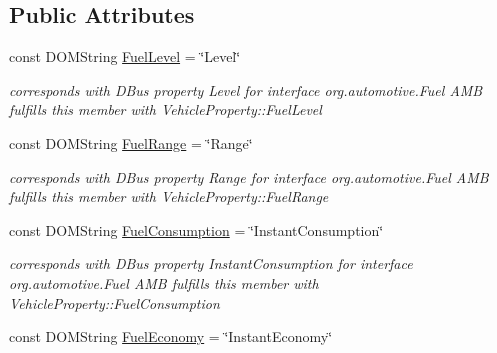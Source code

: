 \subsection*{Public Attributes}
\begin{DoxyCompactItemize}
\item 
\hypertarget{interfaceFuel_a66d804618123a714025400d77e9e0a91}{const D\+O\+M\+String \hyperlink{interfaceFuel_a66d804618123a714025400d77e9e0a91}{Fuel\+Level} = \char`\"{}Level\char`\"{}}\label{interfaceFuel_a66d804618123a714025400d77e9e0a91}

\begin{DoxyCompactList}\small\item\em corresponds with D\+Bus property Level for interface org.\+automotive.\+Fuel A\+M\+B fulfills this member with Vehicle\+Property\+::\+Fuel\+Level \end{DoxyCompactList}\item 
\hypertarget{interfaceFuel_ad587a4868bd4a0bd757bcc816ecf9b8e}{const D\+O\+M\+String \hyperlink{interfaceFuel_ad587a4868bd4a0bd757bcc816ecf9b8e}{Fuel\+Range} = \char`\"{}Range\char`\"{}}\label{interfaceFuel_ad587a4868bd4a0bd757bcc816ecf9b8e}

\begin{DoxyCompactList}\small\item\em corresponds with D\+Bus property Range for interface org.\+automotive.\+Fuel A\+M\+B fulfills this member with Vehicle\+Property\+::\+Fuel\+Range \end{DoxyCompactList}\item 
\hypertarget{interfaceFuel_ab55c40fa9eac6d92afb34d12bafb155c}{const D\+O\+M\+String \hyperlink{interfaceFuel_ab55c40fa9eac6d92afb34d12bafb155c}{Fuel\+Consumption} = \char`\"{}Instant\+Consumption\char`\"{}}\label{interfaceFuel_ab55c40fa9eac6d92afb34d12bafb155c}

\begin{DoxyCompactList}\small\item\em corresponds with D\+Bus property Instant\+Consumption for interface org.\+automotive.\+Fuel A\+M\+B fulfills this member with Vehicle\+Property\+::\+Fuel\+Consumption \end{DoxyCompactList}\item 
\hypertarget{interfaceFuel_a2f89e032fc01b5350ff78ef92b35d869}{const D\+O\+M\+String \hyperlink{interfaceFuel_a2f89e032fc01b5350ff78ef92b35d869}{Fuel\+Economy} = \char`\"{}Instant\+Economy\char`\"{}}\label{interfaceFuel_a2f89e032fc01b5350ff78ef92b35d869}


\end{DoxyCompactItemize}
